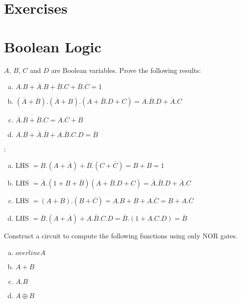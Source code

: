\section*{Exercises}
\vskip 1cm

\setcounter{Exercise}{0}
\setcounter{Answer}{0}


\section*{Boolean Logic}

\begin{ExerciseList}

\Exercise
$A$, $B$, $C$ and $D$ are Boolean variables. Prove the following results:

\begin{enumerate}[a) ]
\item
$A.B + \overline{A}.B + \overline{B}.C + \overline{B}.\overline{C} = 1$
\item
$(\overline{A} + \overline{B}).(\overline{A}+B).(A + \overline{B}.D+C) = \overline{A}.\overline{B}.D+\overline{A}.C$
\item
$\overline{\overline{A}.\overline{B}+\overline{B}.C} = A.\overline{C} + B$
\item
$A.\overline{B} + \overline{A}.\overline{B} + A.\overline{B}.C.D = \overline{B}$
\end{enumerate}

\Answer:
\begin{enumerate}[a) ]
\item
LHS $= B.(A+\overline{A}) + \overline{B}.(C+\overline{C}) = B + \overline{B} =1$
\item
LHS $= \overline A.(1 + B + \overline B)(A + \overline{B}.D+C) = \overline{A}.\overline{B}.D+\overline{A}.C$
\item
LHS $= (A + B).(B + \overline C) = A.B + B + A.\overline C = B + A.\overline C$
\item
LHS $= \overline B.(A + \overline A) + A.\overline B.C.D = \overline B.(1+A.C.D) = \overline B$

\end{enumerate}

\Exercise 
Construct a circuit to compute the following functions using only NOR gates.
\begin{enumerate}[a)]
\item $overline{A}$
\item $A+B$
\item $A.B$
\item $A \oplus B$
\end{enumerate}


\end{ExerciseList}
